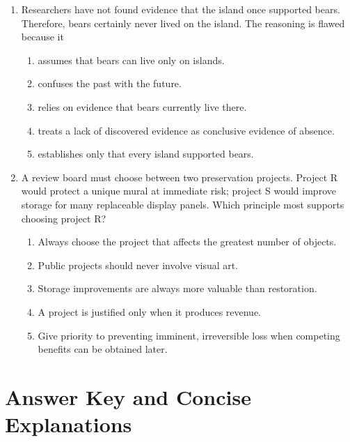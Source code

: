 \begin{enumerate}
\item Researchers have not found evidence that the island once supported bears.
Therefore, bears certainly never lived on the island. The reasoning is flawed
because it
  \begin{enumerate}
  \item assumes that bears can live only on islands.
  \item confuses the past with the future.
  \item relies on evidence that bears currently live there.
  \item treats a lack of discovered evidence as conclusive evidence of absence.
  \item establishes only that every island supported bears.
  \end{enumerate}

\item A review board must choose between two preservation projects. Project R
would protect a unique mural at immediate risk; project S would improve storage
for many replaceable display panels. Which principle most supports choosing
project R?
  \begin{enumerate}
  \item Always choose the project that affects the greatest number of objects.
  \item Public projects should never involve visual art.
  \item Storage improvements are always more valuable than restoration.
  \item A project is justified only when it produces revenue.
  \item Give priority to preventing imminent, irreversible loss when competing
        benefits can be obtained later.
  \end{enumerate}

\end{enumerate}

\section*{Answer Key and Concise Explanations}

